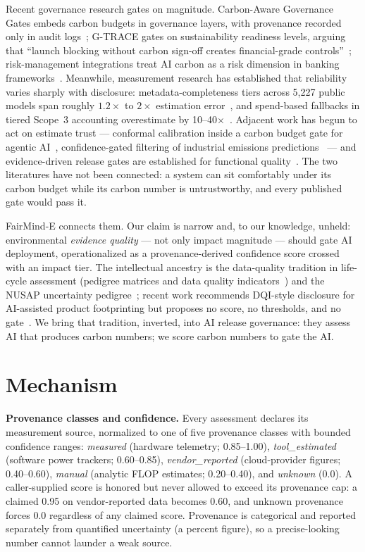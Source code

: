 \documentclass[10pt]{article}
\begin{document}
Recent governance research gates on magnitude. Carbon-Aware Governance Gates
embeds carbon budgets in governance layers, with provenance recorded only in
audit logs~\cite{cagg}; G-TRACE gates on sustainability readiness levels,
arguing that ``launch blocking without carbon sign-off creates financial-grade
controls''~\cite{gtrace}; risk-management integrations treat AI carbon as a
risk dimension in banking frameworks~\cite{tkachenko}. Meanwhile, measurement
research has established that reliability varies sharply with disclosure:
metadata-completeness tiers across 5{,}227 public models span roughly
$1.2\times$ to $2\times$ estimation error~\cite{huggingcarbon}, and
spend-based fallbacks in tiered Scope~3 accounting overestimate by
10--40$\times$~\cite{fourtier}. Adjacent work has begun to act on estimate
trust --- conformal calibration inside a carbon budget gate for agentic
AI~\cite{greensarc}, confidence-gated filtering of industrial emissions
predictions~\cite{trustpems} --- and evidence-driven release gates are
established for functional quality~\cite{selftesting}. The two literatures
have not been connected: a system can sit comfortably under its carbon budget
while its carbon number is untrustworthy, and every published gate would pass
it.

FairMind-E connects them. Our claim is narrow and, to our knowledge, unheld:
environmental \emph{evidence quality} --- not only impact magnitude --- should
gate AI deployment, operationalized as a provenance-derived confidence score
crossed with an impact tier. The intellectual ancestry is the data-quality
tradition in life-cycle assessment (pedigree matrices and data quality
indicators~\cite{weidema}) and the NUSAP uncertainty pedigree~\cite{nusap};
recent work recommends DQI-style disclosure for AI-assisted product
footprinting but proposes no score, no thresholds, and no
gate~\cite{suhcriteria}. We bring that tradition, inverted, into AI release
governance: they assess AI that produces carbon numbers; we score carbon
numbers to gate the AI.

\section{Mechanism}

\textbf{Provenance classes and confidence.} Every assessment declares its
measurement source, normalized to one of five provenance classes with bounded
confidence ranges: \emph{measured} (hardware telemetry; 0.85--1.00),
\emph{tool\_estimated} (software power trackers; 0.60--0.85),
\emph{vendor\_reported} (cloud-provider figures; 0.40--0.60), \emph{manual}
(analytic FLOP estimates; 0.20--0.40), and \emph{unknown} (0.0). A
caller-supplied score is honored but never allowed to exceed its provenance
cap: a claimed 0.95 on vendor-reported data becomes 0.60, and unknown
provenance forces 0.0 regardless of any claimed score. Provenance is
categorical and reported separately from quantified uncertainty (a percent
figure), so a precise-looking number cannot launder a weak source.
\end{document}
